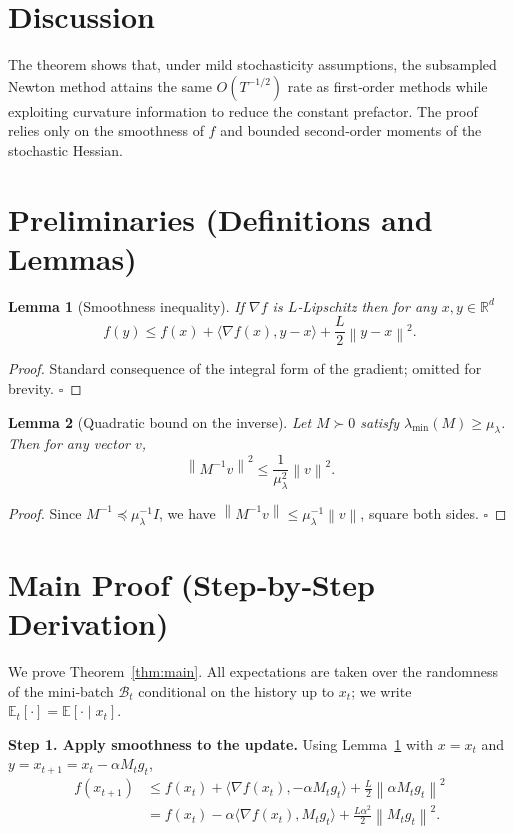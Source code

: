 \documentclass{article}
\newtheorem{lemma}{Lemma}
\newcommand{\E}{\mathbb{E}}
\newcommand{\R}{\mathbb{R}}
\newcommand{\norm}[1]{\left\|#1\right\|}
\newcommand{\inner}[2]{\langle #1,#2\rangle}
\begin{document}
\section*{Discussion}
The theorem shows that, under mild stochasticity assumptions, the subsampled Newton method attains the same $O(T^{-1/2})$ rate as first‑order methods while exploiting curvature information to reduce the constant prefactor. The proof relies only on the smoothness of $f$ and bounded second‑order moments of the stochastic Hessian.

\newpage
\section*{Preliminaries (Definitions and Lemmas)}
\begin{lemma}[Smoothness inequality]\label{lem:smooth}
If $\nabla f$ is $L$‑Lipschitz then for any $x,y\in\R^{d}$
\[
f(y)\le f(x)+\inner{\nabla f(x)}{y-x}+ \frac{L}{2}\norm{y-x}^{2}. \tag{L1}
\]
\end{lemma}
\begin{proof}
Standard consequence of the integral form of the gradient; omitted for brevity. \hfill $\square$
\end{proof}

\begin{lemma}[Quadratic bound on the inverse]\label{lem:inv}
Let $M\succ0$ satisfy $\lambda_{\min}(M)\ge \mu_{\lambda}$. Then for any vector $v$,
\[
\norm{M^{-1}v}^{2}\le\frac{1}{\mu_{\lambda}^{2}}\norm{v}^{2}. \tag{L2}
\]
\end{lemma}
\begin{proof}
Since $M^{-1}\preceq \mu_{\lambda}^{-1}I$, we have $\norm{M^{-1}v}\le \mu_{\lambda}^{-1}\norm{v}$, square both sides. \hfill $\square$
\end{proof}

\section*{Main Proof (Step‑by‑Step Derivation)}
We prove Theorem~\ref{thm:main}. All expectations are taken over the randomness of the mini‑batch $\mathcal{B}_{t}$ conditional on the history up to $x_{t}$; we write $\E_{t}[\cdot]=\E[\cdot\mid x_{t}]$.

\noindent\textbf{Step 1. Apply smoothness to the update.}  
Using Lemma~\ref{lem:smooth} with $x=x_{t}$ and $y=x_{t+1}=x_{t}-\alpha M_{t}g_{t}$,
\[
\begin{aligned}
f(x_{t+1})
&\le f(x_{t})+\inner{\nabla f(x_{t})}{-\alpha M_{t}g_{t}}
   +\frac{L}{2}\norm{\alpha M_{t}g_{t}}^{2} \tag{3} \\
&= f(x_{t})-\alpha\inner{\nabla f(x_{t})}{M_{t}g_{t}}
   +\frac{L\alpha^{2}}{2}\norm{M_{t}g_{t}}^{2}. 
\end{aligned}
\]
\end{document}
